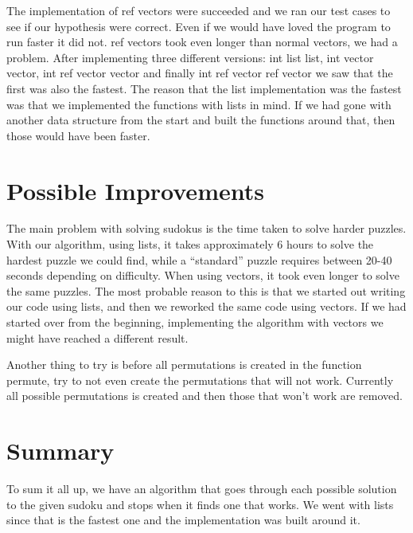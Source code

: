 \documentclass[12pt, a4paper]{article}
\begin{document}
\begin{adjustwidth}{3em}{0pt}
			The implementation of ref vectors were succeeded and we ran our test cases to see if our hypothesis were correct. Even if we would have loved the program to run faster it did not. ref vectors took even longer than normal vectors, we had a problem. After implementing three different versions: int list list, int vector vector, int ref vector vector and finally int ref vector ref vector we saw that the first was also the fastest. The reason that the list implementation was the fastest was that we implemented the functions with lists in mind. If we had gone with another data structure from the start and built the functions around that, then those would have been faster.
		\end{adjustwidth}

	\section{Possible Improvements}
		\begin{adjustwidth}{3em}{0pt}
			The main problem with solving sudokus is the time taken to solve harder puzzles. With our algorithm, using lists, it takes approximately 6 hours to solve the hardest puzzle we could find, while a “standard” puzzle requires between 20-40 seconds depending on difficulty. When using vectors, it took even longer to solve the same puzzles. The most probable reason to this is that we started out writing our code using lists, and then we reworked the same code using vectors. If we had started over from the beginning, implementing the algorithm with vectors we might have reached a different result.

			Another thing to try is before all permutations is created in the function permute, try to not even create the permutations that will not work. Currently all possible permutations is created and then those that won’t work are removed.
		\end{adjustwidth}
		
	\section{Summary}
		\begin{adjustwidth}{3em}{0pt}
			To sum it all up, we have an algorithm that goes through each possible solution to the given sudoku and stops when it finds one that works. We went with lists since that is the fastest one and the implementation was built around it.
		\end{adjustwidth}
	
\end{document}
